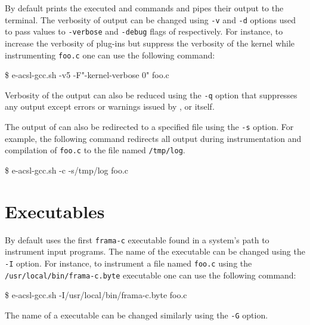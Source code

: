 By default \eacslgcc prints the executed \framac and \gcc commands and pipes
their output to the terminal. The verbosity of \framac output can be changed
using \texttt{-v} and \texttt{-d} options used to pass values to
\texttt{-verbose} and \texttt{-debug} flags of \framac respectively.  For
instance, to increase the verbosity of plug-ins but suppress the verbosity of
the \framac kernel while instrumenting \texttt{foo.c} one can use the following
command:

\begin{shell}
 \$ e-acsl-gcc.sh -v5 -F"-kernel-verbose 0" foo.c
\end{shell}

Verbosity of the \eacslgcc output can also be reduced using the \texttt{-q}
option that suppresses any output except errors or warnings issued by \gcc,
\framac or \eacslgcc itself.

The output of \eacslgcc can also be redirected to a specified file using the
\texttt{-s} option.  For example, the following command redirects all
output during instrumentation and compilation of \texttt{foo.c} to the
file named \texttt{/tmp/log}.

\begin{shell}
 \$ e-acsl-gcc.sh -c -s/tmp/log foo.c
\end{shell}


\section{Executables}

By default \eacslgcc uses the first \texttt{frama-c} executable found in a
system's path to instrument input programs. The name of the \framac executable
can be changed using the \texttt{-I} option. For instance, to instrument a file
named \texttt{foo.c} using the \texttt{/usr/local/bin/frama-c.byte} executable
one can use the following command:

\begin{shell}
 \$ e-acsl-gcc.sh -I/usr/local/bin/frama-c.byte foo.c
\end{shell}

The name of a \gcc executable can be changed similarly using the \texttt{-G}
option.
